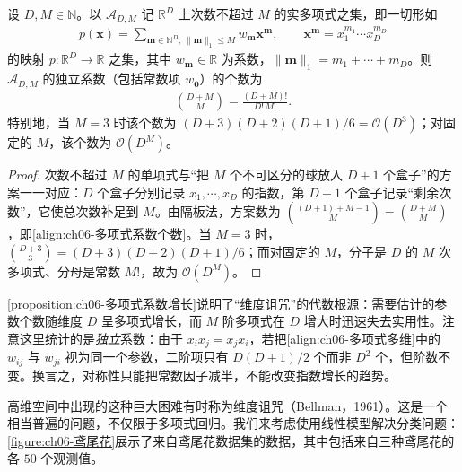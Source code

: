 \documentclass[../../main.tex]{subfiles}
\begin{document}
\begin{proposition}[多项式系数的数量]\label{proposition:ch06-多项式系数增长}
设 $D,M\in\mathbb{N}$。以 $\mathcal{A}_{D,M}$ 记 $\mathbb{R}^{D}$ 上次数不超过 $M$ 的实多项式之集，即一切形如
\begin{align*}
p(\boldsymbol{x})=\sum_{\boldsymbol{m}\in\mathbb{N}^{D},\ \|\boldsymbol{m}\|_{1}\leqslant M}w_{\boldsymbol{m}}\boldsymbol{x}^{\boldsymbol{m}},\qquad
\boldsymbol{x}^{\boldsymbol{m}}=x_{1}^{m_{1}}\cdots x_{D}^{m_{D}}
\end{align*}
的映射 $p:\mathbb{R}^{D}\to\mathbb{R}$ 之集，其中 $w_{\boldsymbol{m}}\in\mathbb{R}$ 为系数，$\|\boldsymbol{m}\|_{1}=m_{1}+\cdots+m_{D}$。则 $\mathcal{A}_{D,M}$ 的独立系数（包括常数项 $w_{\boldsymbol{0}}$）的个数为
\begin{align}
\binom{D+M}{M}=\frac{(D+M)!}{D!\,M!}.
\label{align:ch06-多项式系数个数}
\end{align}
特别地，当 $M=3$ 时该个数为 $(D+3)(D+2)(D+1)/6=\mathcal{O}(D^{3})$；对固定的 $M$，该个数为 $\mathcal{O}(D^{M})$。
\end{proposition}

\begin{proof}
次数不超过 $M$ 的单项式与“把 $M$ 个不可区分的球放入 $D+1$ 个盒子”的方案一一对应：$D$ 个盒子分别记录 $x_1,\cdots,x_D$ 的指数，第 $D+1$ 个盒子记录“剩余次数”，它使总次数补足到 $M$。由隔板法，方案数为 $\binom{(D+1)+M-1}{M}=\binom{D+M}{M}$，即\eqref{align:ch06-多项式系数个数}。当 $M=3$ 时，$\binom{D+3}{3}=(D+3)(D+2)(D+1)/6$；而对固定的 $M$，分子是 $D$ 的 $M$ 次多项式、分母是常数 $M!$，故为 $\mathcal{O}(D^{M})$。
\end{proof}

\begin{remark}\cref{proposition:ch06-多项式系数增长}说明了“维度诅咒”的代数根源：需要估计的参数个数随维度 $D$ 呈多项式增长，而 $M$ 阶多项式在 $D$ 增大时迅速失去实用性。注意这里统计的是\emph{独立}系数：由于 $x_ix_j=x_jx_i$，若把\eqref{align:ch06-多项式多维}中的 $w_{ij}$ 与 $w_{ji}$ 视为同一个参数，二阶项只有 $D(D+1)/2$ 个而非 $D^{2}$ 个，但阶数不变。换言之，对称性只能把常数因子减半，不能改变指数增长的趋势。
\end{remark}

高维空间中出现的这种巨大困难有时称为维度诅咒（Bellman，1961）。这是一个相当普遍的问题，不仅限于多项式回归。我们来考虑使用线性模型解决分类问题：\cref{figure:ch06-鸢尾花}展示了来自鸢尾花数据集的数据，其中包括来自三种鸢尾花的各 $50$ 个观测值。
\end{document}
